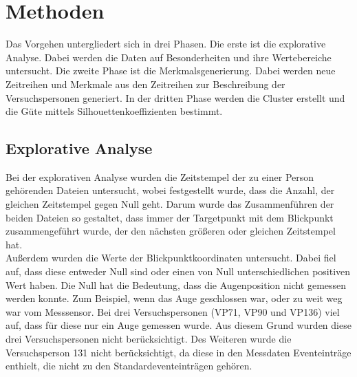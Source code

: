 \documentclass[12pt]{article}
\begin{document}
\section*{Methoden}
Das Vorgehen untergliedert sich in drei Phasen. Die erste ist die explorative Analyse. Dabei werden die Daten auf Besonderheiten und ihre Wertebereiche untersucht. Die zweite Phase ist die Merkmalsgenerierung. Dabei werden neue Zeitreihen und Merkmale aus den Zeitreihen zur Beschreibung der Versuchspersonen generiert. In der dritten Phase werden die Cluster erstellt und die G\"ute mittels Silhouettenkoeffizienten bestimmt.

\subsection*{Explorative Analyse}
Bei der explorativen Analyse wurden die Zeitstempel der zu einer Person geh\"orenden Dateien untersucht, wobei festgestellt wurde, dass die Anzahl, der gleichen Zeitstempel gegen Null geht. Darum wurde das Zusammenf\"uhren der beiden Dateien so gestaltet, dass immer der Targetpunkt mit dem Blickpunkt zusammengef\"uhrt wurde, der den n\"achsten gr\"o\ss{}eren oder gleichen Zeitstempel hat.\\
Au\ss{}erdem wurden die Werte der Blickpunktkoordinaten untersucht. Dabei fiel auf, dass diese entweder Null sind oder einen von Null unterschiedlichen positiven Wert haben. Die Null hat die Bedeutung, dass die Augenposition nicht gemessen werden konnte. Zum Beispiel, wenn das Auge geschlossen war, oder zu weit weg war vom Messsensor. Bei drei Versuchspersonen (VP71, VP90 und VP136) viel auf, dass f\"ur diese nur ein Auge gemessen wurde. Aus diesem Grund wurden diese drei Versuchspersonen nicht ber\"ucksichtigt. Des Weiteren wurde die Versuchsperson 131 nicht ber\"ucksichtigt, da diese in den Messdaten Eventeintr\"age enthielt, die nicht zu den Standardeventeintr\"agen geh\"oren.
\end{document}
